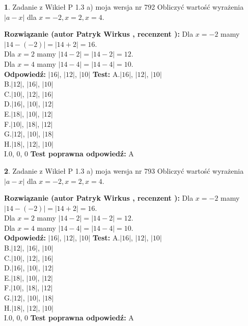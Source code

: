 \documentclass[12pt, a4paper]{article}
\theoremstyle{definition} %
\newtheorem{zad}{}
\newcommand{\zadStart}[1]{\begin{zad}#1\newline}
\newcommand{\zadStop}{\end{zad}}
\newcommand{\rozwStart}[2]{\noindent \textbf{Rozwiązanie (autor #1 , recenzent #2): }\newline}
\newcommand{\rozwStop}{\newline}
\newcommand{\odpStart}{\noindent \textbf{Odpowiedź:}\newline}
\newcommand{\odpStop}{\newline}
\newcommand{\testStart}{\noindent \textbf{Test:}\newline}
\newcommand{\testStop}{\newline}
\newcommand{\kluczStart}{\noindent \textbf{Test poprawna odpowiedź:}\newline}
\newcommand{\kluczStop}{\newline}
\begin{document}
\zadStart{Zadanie z Wikieł P 1.3 a) moja wersja nr 792}
Obliczyć wartość wyrażenia $|a - x|$ dla $x=-2,x=2,x=4$.
\zadStop
\rozwStart{Patryk Wirkus}{}
Dla $x = -2$ mamy $|14 - (-2)| = |14 + 2| = 16$.\\
Dla $x = 2$ mamy $|14 - 2| = |14 - 2| = 12$.\\
Dla $x = 4$ mamy $|14 - 4| = |14 - 4| = 10$.\\
\rozwStop
\odpStart
$|16|$, $|12|$, $|10|$
\odpStop
\testStart
A.$|16|$, $|12|$, $|10|$\\
B.$|12|$, $|16|$, $|10|$\\
C.$|10|$, $|12|$, $|16|$\\
D.$|16|$, $|10|$, $|12|$\\
E.$|18|$, $|10|$, $|12|$\\
F.$|10|$, $|18|$, $|12|$\\
G.$|12|$, $|10|$, $|18|$\\
H.$|18|$, $|12|$, $|10|$\\
I.$0$, $0$, $0$
\testStop
\kluczStart
A
\kluczStop



\zadStart{Zadanie z Wikieł P 1.3 a) moja wersja nr 793}
Obliczyć wartość wyrażenia $|a - x|$ dla $x=-2,x=2,x=4$.
\zadStop
\rozwStart{Patryk Wirkus}{}
Dla $x = -2$ mamy $|14 - (-2)| = |14 + 2| = 16$.\\
Dla $x = 2$ mamy $|14 - 2| = |14 - 2| = 12$.\\
Dla $x = 4$ mamy $|14 - 4| = |14 - 4| = 10$.\\
\rozwStop
\odpStart
$|16|$, $|12|$, $|10|$
\odpStop
\testStart
A.$|16|$, $|12|$, $|10|$\\
B.$|12|$, $|16|$, $|10|$\\
C.$|10|$, $|12|$, $|16|$\\
D.$|16|$, $|10|$, $|12|$\\
E.$|18|$, $|10|$, $|12|$\\
F.$|10|$, $|18|$, $|12|$\\
G.$|12|$, $|10|$, $|18|$\\
H.$|18|$, $|12|$, $|10|$\\
I.$0$, $0$, $0$
\testStop
\kluczStart
A
\kluczStop
\end{document}
